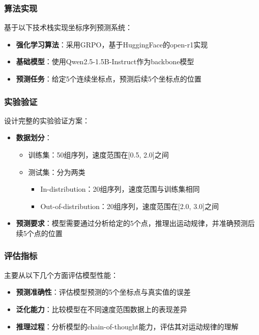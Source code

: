 \documentclass[a4paper, 12pt]{article}
\begin{document}
\subsubsection{算法实现}
基于以下技术栈实现坐标序列预测系统：
\begin{itemize}
    \item \textbf{强化学习算法}：采用GRPO\cite{grpo2024}，基于HuggingFace的open-r1\cite{openr1}实现
    \item \textbf{基础模型}：使用Qwen2.5-1.5B-Instruct\cite{qwen2024}作为backbone模型
    \item \textbf{预测任务}：给定5个连续坐标点，预测后续5个坐标点的位置
\end{itemize}

\subsubsection{实验验证}
设计完整的实验验证方案：
\begin{itemize}
    \item \textbf{数据划分}：
        \begin{itemize}
            \item 训练集：50组序列，速度范围在[0.5, 2.0]之间
            \item 测试集：分为两类
                \begin{itemize}
                    \item In-distribution：20组序列，速度范围与训练集相同
                    \item Out-of-distribution：20组序列，速度范围在[2.0, 3.0]之间
                \end{itemize}
        \end{itemize}
    \item \textbf{预测要求}：模型需要通过分析给定的5个点，推理出运动规律，并准确预测后续5个点的位置
\end{itemize}

\subsubsection{评估指标}
主要从以下几个方面评估模型性能：
\begin{itemize}
    \item \textbf{预测准确性}：评估模型预测的5个坐标点与真实值的误差
    \item \textbf{泛化能力}：比较模型在不同速度范围数据上的表现差异
    \item \textbf{推理过程}：分析模型的chain-of-thought能力，评估其对运动规律的理解
\end{itemize}
\end{document}
